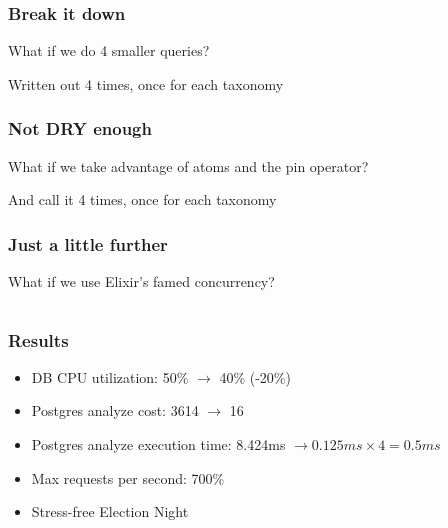\documentclass{beamer}
\begin{document}
\begin{frame}
\frametitle{Break it down}
	What if we do 4 smaller queries?
	\pause
	
	\pause
	Written out 4 times,  once for each taxonomy
\end{frame}


\begin{frame}
\frametitle{Not DRY enough}
	What if we take advantage of atoms and the pin operator?
	\pause
	
	\pause
	And call it 4 times,  once for each taxonomy
\end{frame}


\begin{frame}
\frametitle{Just a little further}
	What if we use Elixir's famed concurrency?
	\pause
	\begin{columns}
		\begin{column}{0.3\textwidth}
		    
		\end{column}
		\begin{column}{0.6\textwidth}
		    
		\end{column}
	\end{columns}
\end{frame}


\begin{frame}
\frametitle{Results}
	\begin{itemize}
		\item DB CPU utilization: 50\% $\rightarrow$ 40\% (-20\%)
		\item Postgres analyze cost: 3614 $\rightarrow$ 16
		\item Postgres analyze execution time: 8.424ms $\rightarrow 0.125ms \times 4 = 0.5ms$
		\item Max requests per second: 700\%
		\item Stress-free Election Night
	\end{itemize}
\end{frame}
\end{document}
